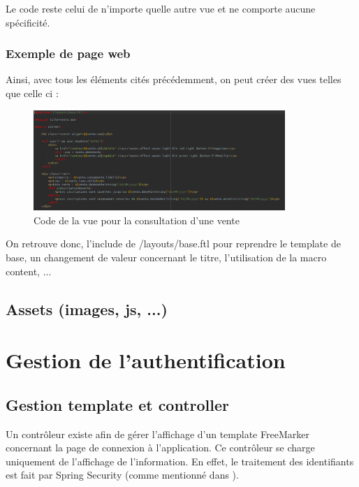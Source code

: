 				Le code reste celui de n'importe quelle autre vue et ne comporte aucune spécificité.

			\subsubsection{Exemple de page web}

				Ainsi, avec tous les éléments cités précédemment, on peut créer des vues telles que celle ci :

				\begin{figure}[H]
					\centering\includegraphics[width=0.85\textwidth, keepaspectratio]{res/view-venteConsulter.png}
					\caption{Code de la vue pour la consultation d'une vente}
				\end{figure}
				On retrouve donc, l'include de /layouts/base.ftl pour reprendre le template de base, un changement de valeur concernant le titre, l'utilisation de la macro content, ...

		\subsection{Assets (images, js, ...)}


	\section{Gestion de l'authentification}

		\subsection{Gestion template et controller}

			Un contrôleur existe afin de gérer l'affichage d'un template FreeMarker concernant la page de connexion à l'application. Ce contrôleur se charge uniquement de l'affichage de l'information. En effet, le traitement des identifiants est fait par Spring Security (comme mentionné dans ).

